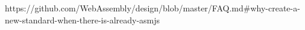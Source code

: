 https://github.com/WebAssembly/design/blob/master/FAQ.md#why-create-a-new-standard-when-there-is-already-asmjs
